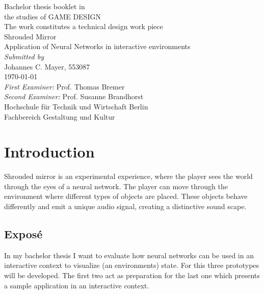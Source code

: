 \documentclass[a4paper, twoside, 10pt]{report}
\begin{document}
\begin{center}
\begin{spacing}{1.5}
{\Large
Bachelor thesis booklet in \\ the studies of GAME DESIGN \\
\vspace*{\fill}
The work constitutes a technical design work piece \\
\vspace*{\fill}
{\huge Shrouded Mirror} \\
Application of Neural Networks in interactive environments \\
\vspace*{\fill}
\textit{Submitted by} \\
Johannes C. Mayer, 553087 \\
\today \\
\vspace*{\fill}
\textit{First Examiner:} Prof. Thomas Bremer \\
\textit{Second Examiner:} Prof. Susanne Brandhorst \\
\vspace*{\fill}
Hochschule f\"ur Technik und Wirtschaft Berlin \\
Fachbereich Gestaltung und Kultur \\
}
\end{spacing}
\end{center}

\newpage

\tableofcontents
\cleardoublepage
\newpage
{}

\chapter{Introduction}
Shrouded mirror is an experimental experience, where the player sees the world through the eyes of a neural network. The player can move through the environment where different types of objects are placed. These objects behave differently and emit a unique audio signal, creating a distinctive sound scape.

\section{Expos\'e}
In my bachelor thesis I want to evaluate how neural networks can be used in an interactive context to visualize (an environments) state. For this three prototypes will be developed. The first two act as preparation for the last one which presents a sample application in an interactive context.
\end{document}
